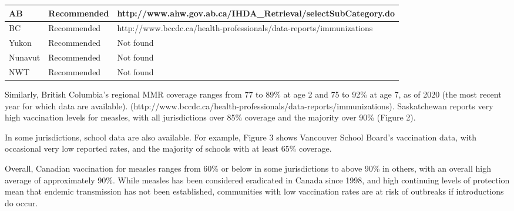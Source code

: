 \documentclass[12pt,a4paper]{article}
\begin{document}
\begin{table}[h!]
\begin{tabular}{lp{3cm}p{10cm}}
AB       & Recommended               & http://www.ahw.gov.ab.ca/IHDA\_Retrieval/selectSubCategory.do                                                                                                                       \\ \hline
BC       & Recommended               & http://www.bccdc.ca/health-professionals/data-reports/immunizations                                                                                                                 \\ \hline
Yukon    & Recommended               & Not found                                                                                                                                                                           \\ \hline
Nunavut  & Recommended               & Not found                                                                                                                                                                           \\ \hline
NWT      & Recommended               & Not found
\end{tabular}
\end{table}

Similarly, British Columbia’s regional MMR coverage ranges from 77 to 89\% at age 2 and 75 to 92\% at age 7, as of 2020 (the most recent year for which data are available). (http://www.bccdc.ca/health-professionals/data-reports/immunizations). Saskatchewan reports very high vaccination levels for measles, with all jurisdictions over 85\% coverage and the majority over 90\% (Figure 2).

In some jurisdictions, school data are also available. For example, Figure 3 shows Vancouver School Board’s vaccination data, with occasional very low reported rates, and the majority of schools with at least 65\% coverage.

Overall, Canadian vaccination for measles ranges from 60\% or below in some jurisdictions to above 90\% in others, with an overall high average of approximately 90\%. While measles has been considered eradicated in Canada since 1998, and high continuing levels of protection mean that endemic transmission has not been established, communities with low vaccination rates are at risk of outbreaks if introductions do occur.
\end{document}
